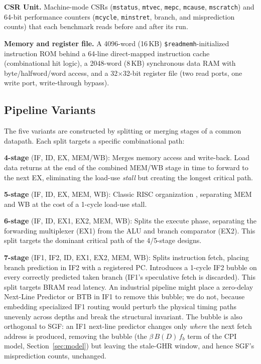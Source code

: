 \documentclass[acmsmall,nonacm,screen]{acmart}
\begin{document}
\textbf{CSR Unit.} Machine-mode CSRs (\texttt{mstatus}, \texttt{mtvec}, \texttt{mepc}, \texttt{mcause}, \texttt{mscratch}) and 64-bit performance counters (\texttt{mcycle}, \texttt{minstret}, branch, and misprediction counts) that each benchmark reads before and after its run.

\textbf{Memory and register file.} A 4096-word (16\,KB) \texttt{\$readmemh}-initialized instruction ROM behind a 64-line direct-mapped instruction cache (combinational hit logic), a 2048-word (8\,KB) synchronous data RAM with byte/halfword/word access, and a 32$\times$32-bit register file (two read ports, one write port, write-through bypass).

\subsection{Pipeline Variants}
\label{sec:variants}

The five variants are constructed by splitting or merging stages of a common datapath.
Each split targets a specific combinational path:

\textbf{4-stage} (IF, ID, EX, MEM/WB): Merges memory access and write-back. Load data returns at the end of the combined MEM/WB stage in time to forward to the next EX, eliminating the load-use \emph{stall} but creating the longest critical path.

\textbf{5-stage} (IF, ID, EX, MEM, WB): Classic RISC organization \cite{patterson1985reduced}, separating MEM and WB at the cost of a 1-cycle load-use stall.

\textbf{6-stage} (IF, ID, EX1, EX2, MEM, WB): Splits the execute phase, separating the forwarding multiplexer (EX1) from the ALU and branch comparator (EX2). This split targets the dominant critical path of the 4/5-stage designs.

\textbf{7-stage} (IF1, IF2, ID, EX1, EX2, MEM, WB): Splits instruction fetch, placing branch prediction in IF2 with a registered PC. Introduces a 1-cycle IF2 bubble on every correctly predicted taken branch (IF1's speculative fetch is discarded). This split targets BRAM read latency. An industrial pipeline might place a zero-delay Next-Line Predictor or BTB in IF1 to remove this bubble; we do not, because embedding specialized IF1 routing would perturb the physical timing paths unevenly across depths and break the structural invariant. The bubble is also orthogonal to SGF: an IF1 next-line predictor changes only \emph{where} the next fetch address is produced, removing the bubble (the $\beta\,B(D)\,f_b$ term of the CPI model, Section~\ref{sec:model}) but leaving the stale-GHR window, and hence SGF's misprediction counts, unchanged.
\end{document}
